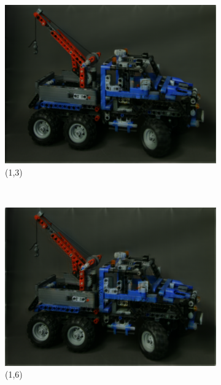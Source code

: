 \documentclass[11pt,a4paper,titlepage]{article}
\begin{document}
\begin{figure}
\begin{subfigure}[t]{0.31\textwidth}
		\includegraphics[width=\textwidth]{results/tiles_legotruck_6x6x480x640_480x640x5_tiling_4x6x200x200_overlap_0.5/Reconstruction_of_view_(1,3).png}
		\caption{(1,3)}
	\end{subfigure}%
	~
	\begin{subfigure}[t]{0.31\textwidth}
		\includegraphics[width=\textwidth]{results/tiles_legotruck_6x6x480x640_480x640x5_tiling_4x6x200x200_overlap_0.5/Reconstruction_of_view_(1,6).png}
		\caption{(1,6)}
	\end{subfigure}%
	\\
	\begin{subfigure}[t]{0.31\textwidth}

\end{subfigure}
\end{figure}
\end{document}

